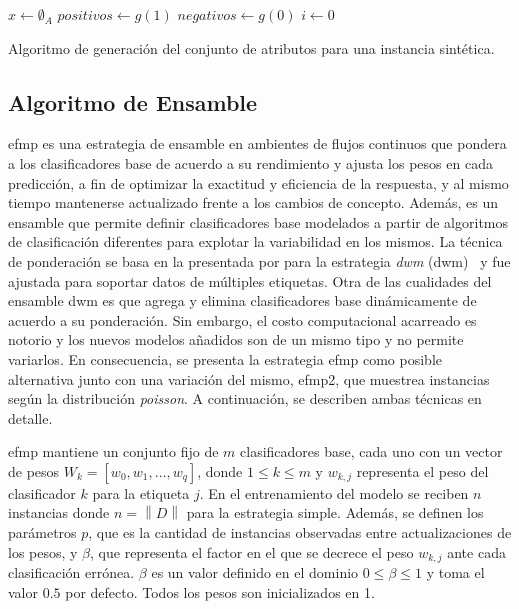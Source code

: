 \begin{center}
	\begin{algorithm}[H]
		\label{alg:generar_atributos}
		\SetAlgoLined
		\DontPrintSemicolon
		$x \gets \emptyset_{A}$\;
		$positivos \gets g(1)$ \;
		$negativos \gets g(0)$ \;
		$i \gets 0$ \;
		\caption{Algoritmo de generación del conjunto de atributos para una
			instancia sintética.}
	\end{algorithm}
\end{center}

\subsection{Algoritmo de Ensamble}
\label{tecnica_algoritmo_ensamble}

\acrfull{efmp} es una estrategia de ensamble en ambientes de flujos continuos
que pondera a los clasificadores base de acuerdo a su rendimiento y ajusta los
pesos en cada predicción, a fin de optimizar la exactitud y eficiencia de la
respuesta, y al mismo tiempo mantenerse actualizado frente a los cambios de
concepto. Además, es un ensamble que permite definir clasificadores base
modelados a partir de algoritmos de clasificación diferentes para explotar la
variabilidad en los mismos. La técnica de ponderación se basa en la presentada
por \citeauthor{kolter_dynamic_2007} para la estrategia \textit{\acrlong{dwm}}
(\acrshort{dwm})~\cite{kolter_dynamic_2007} y fue ajustada para soportar datos
de múltiples etiquetas. Otra de las cualidades del ensamble \acrshort{dwm} es
que agrega y elimina clasificadores base dinámicamente de acuerdo a su
ponderación. Sin embargo, el costo computacional acarreado es notorio y los
nuevos modelos añadidos son de un mismo tipo y no permite variarlos.  En
consecuencia, se presenta la estrategia \acrshort{efmp} como posible alternativa
junto con una variación del mismo, \acrshort{efmp2}, que muestrea instancias
según la distribución \textit{poisson}. A continuación, se describen ambas
técnicas en detalle.

\acrshort{efmp} mantiene un conjunto fijo de $m$ clasificadores base, cada uno
con un vector de pesos $W_{k} = [w_{0}, w_{1}, \dots, w_{q}]$, donde $1 \leq k
	\leq m$ y $w_{k,j}$ representa el peso del clasificador $k$ para la etiqueta
$j$. En el entrenamiento del modelo se reciben $n$ instancias donde
$n=\left\|D\right\|$ para la estrategia simple. Además, se definen los parámetros
$p$, que es la cantidad de instancias observadas entre actualizaciones de los
pesos, y $\beta$, que representa el factor en el que se decrece el peso
$w_{k,j}$ ante cada clasificación errónea. $\beta$ es un valor definido en el
dominio $0 \leq \beta \leq 1$ y toma el valor $0.5$ por defecto. Todos los pesos
son inicializados en 1.

